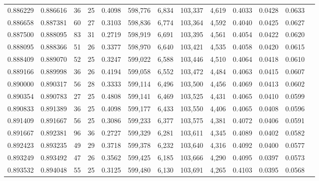 \begin{tabular}{rrrrrrrrrrrrr}
0.886229 & 0.886616 &     36 &    25 &                                     0.4098 & 598,776 &   6,834 & 103,337 &   4,619 & 0.4033 & 0.0428 & 0.0633 \\
0.886658 & 0.887381 &     60 &    27 &                                     0.3103 & 598,836 &   6,774 & 103,364 &   4,592 & 0.4040 & 0.0425 & 0.0627 \\
0.887500 & 0.888095 &     83 &    31 &                                     0.2719 & 598,919 &   6,691 & 103,395 &   4,561 & 0.4054 & 0.0422 & 0.0620 \\
0.888095 & 0.888366 &     51 &    26 &                                     0.3377 & 598,970 &   6,640 & 103,421 &   4,535 & 0.4058 & 0.0420 & 0.0615 \\
0.888409 & 0.889070 &     52 &    25 &                                     0.3247 & 599,022 &   6,588 & 103,446 &   4,510 & 0.4064 & 0.0418 & 0.0610 \\
0.889166 & 0.889998 &     36 &    26 &                                     0.4194 & 599,058 &   6,552 & 103,472 &   4,484 & 0.4063 & 0.0415 & 0.0607 \\
0.890000 & 0.890317 &     56 &    28 &                                     0.3333 & 599,114 &   6,496 & 103,500 &   4,456 & 0.4069 & 0.0413 & 0.0602 \\
0.890354 & 0.890783 &     27 &    25 &                                     0.4808 & 599,141 &   6,469 & 103,525 &   4,431 & 0.4065 & 0.0410 & 0.0599 \\
0.890833 & 0.891389 &     36 &    25 &                                     0.4098 & 599,177 &   6,433 & 103,550 &   4,406 & 0.4065 & 0.0408 & 0.0596 \\
0.891409 & 0.891667 &     56 &    25 &                                     0.3086 & 599,233 &   6,377 & 103,575 &   4,381 & 0.4072 & 0.0406 & 0.0591 \\
0.891667 & 0.892381 &     96 &    36 &                                     0.2727 & 599,329 &   6,281 & 103,611 &   4,345 & 0.4089 & 0.0402 & 0.0582 \\
0.892423 & 0.893235 &     49 &    29 &                                     0.3718 & 599,378 &   6,232 & 103,640 &   4,316 & 0.4092 & 0.0400 & 0.0577 \\
0.893249 & 0.893492 &     47 &    26 &                                     0.3562 & 599,425 &   6,185 & 103,666 &   4,290 & 0.4095 & 0.0397 & 0.0573 \\
0.893532 & 0.894048 &     55 &    25 &                                     0.3125 & 599,480 &   6,130 & 103,691 &   4,265 & 0.4103 & 0.0395 & 0.0568 \\

\end{tabular}
